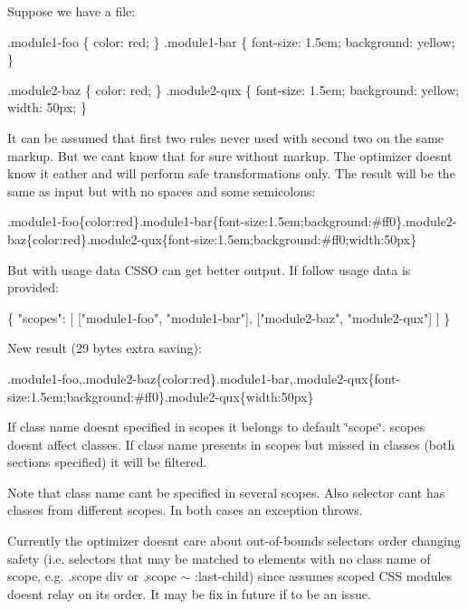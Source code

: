 Suppose we have a file\+:


\begin{DoxyCode}
.module1-foo \{ color: red; \}
.module1-bar \{ font-size: 1.5em; background: yellow; \}

.module2-baz \{ color: red; \}
.module2-qux \{ font-size: 1.5em; background: yellow; width: 50px; \}
\end{DoxyCode}


It can be assumed that first two rules never used with second two on the same markup. But we can\textquotesingle{}t know that for sure without markup. The optimizer doesn\textquotesingle{}t know it eather and will perform safe transformations only. The result will be the same as input but with no spaces and some semicolons\+:


\begin{DoxyCode}

      .module1-foo\{color:red\}.module1-bar\{font-size:1.5em;background:#ff0\}.module2-baz\{color:red\}.module2-qux\{font-size:1.5em;background:#ff0;width:50px\}
\end{DoxyCode}


But with usage data {\ttfamily C\+S\+SO} can get better output. If follow usage data is provided\+:


\begin{DoxyCode}
\{
    "scopes": [
        ["module1-foo", "module1-bar"],
        ["module2-baz", "module2-qux"]
    ]
\}
\end{DoxyCode}


New result (29 bytes extra saving)\+:


\begin{DoxyCode}

      .module1-foo,.module2-baz\{color:red\}.module1-bar,.module2-qux\{font-size:1.5em;background:#ff0\}.module2-qux\{width:50px\}
\end{DoxyCode}


If class name doesn\textquotesingle{}t specified in {\ttfamily scopes} it belongs to default \char`\"{}scope\char`\"{}. {\ttfamily scopes} doesn\textquotesingle{}t affect {\ttfamily classes}. If class name presents in {\ttfamily scopes} but missed in {\ttfamily classes} (both sections specified) it will be filtered.

Note that class name can\textquotesingle{}t be specified in several scopes. Also selector can\textquotesingle{}t has classes from different scopes. In both cases an exception throws.

Currently the optimizer doesn\textquotesingle{}t care about out-\/of-\/bounds selectors order changing safety (i.\+e. selectors that may be matched to elements with no class name of scope, e.\+g. {\ttfamily .scope div} or {\ttfamily .scope $\sim$ \+:last-\/child}) since assumes scoped C\+SS modules doesn\textquotesingle{}t relay on it\textquotesingle{}s order. It may be fix in future if to be an issue.

